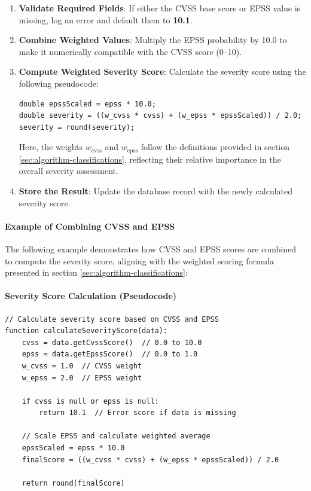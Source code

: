 \begin{enumerate}
  \item \textbf{Validate Required Fields}: If either the \ac{CVSS} base score or \ac{EPSS} value is missing, log an error and default them to \textbf{10.1}.
  
  \item \textbf{Combine Weighted Values}: Multiply the \ac{EPSS} probability by 10.0 to make it numerically compatible with the \ac{CVSS} score (0--10).

  \item \textbf{Compute Weighted Severity Score}: Calculate the severity score using the following pseudocode:

  \begin{verbatim}
double epssScaled = epss * 10.0;
double severity = ((w_cvss * cvss) + (w_epss * epssScaled)) / 2.0;
severity = round(severity);
  \end{verbatim}

  Here, the weights \( w_{\text{cvss}} \) and \( w_{\text{epss}} \) follow the definitions provided in section \ref{sec:algorithm-classifications}, reflecting their relative importance in the overall severity assessment.

  \item \textbf{Store the Result}: Update the database record with the newly calculated severity score.
\end{enumerate}

\paragraph{Example of Combining \ac{CVSS} and \ac{EPSS}}
\label{par:cvss-epss-combination}
The following example demonstrates how \ac{CVSS} and \ac{EPSS} scores are combined to compute the severity score, aligning with the weighted scoring formula presented in section \ref{sec:algorithm-classifications}:
\noindent
\paragraph{Severity Score Calculation (Pseudocode)}
\label{par:severity-score-calculation}

\begin{verbatim}
// Calculate severity score based on CVSS and EPSS
function calculateSeverityScore(data):
    cvss = data.getCvssScore()  // 0.0 to 10.0
    epss = data.getEpssScore()  // 0.0 to 1.0
    w_cvss = 1.0  // CVSS weight
    w_epss = 2.0  // EPSS weight

    if cvss is null or epss is null:
        return 10.1  // Error score if data is missing

    // Scale EPSS and calculate weighted average
    epssScaled = epss * 10.0
    finalScore = ((w_cvss * cvss) + (w_epss * epssScaled)) / 2.0

    return round(finalScore)
\end{verbatim}



